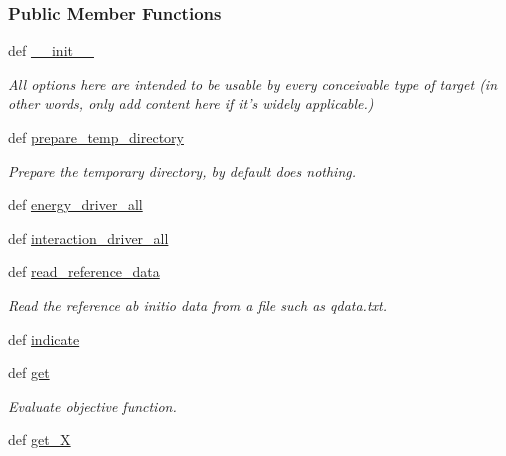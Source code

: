 \subsubsection*{\-Public \-Member \-Functions}
\begin{DoxyCompactItemize}
\item 
def \hyperlink{classforcebalance_1_1tinkerio_1_1Interaction__TINKER_a34afd2802edb7d35200abb09ccf6f8c7}{\-\_\-\-\_\-init\-\_\-\-\_\-}
\begin{DoxyCompactList}\small\item\em \-All options here are intended to be usable by every conceivable type of target (in other words, only add content here if it's widely applicable.) \end{DoxyCompactList}\item 
def \hyperlink{classforcebalance_1_1tinkerio_1_1Interaction__TINKER_a362b96263fb15f951fd7653b88a91efa}{prepare\-\_\-temp\-\_\-directory}
\begin{DoxyCompactList}\small\item\em \-Prepare the temporary directory, by default does nothing. \end{DoxyCompactList}\item 
def \hyperlink{classforcebalance_1_1tinkerio_1_1Interaction__TINKER_a5c55a2a8ed4c2923ed9866e1a7b6d202}{energy\-\_\-driver\-\_\-all}
\item 
def \hyperlink{classforcebalance_1_1tinkerio_1_1Interaction__TINKER_aa04011719babeea254134426db8c7633}{interaction\-\_\-driver\-\_\-all}
\item 
def \hyperlink{classforcebalance_1_1interaction_1_1Interaction_aa67c082c3b6fa2d87ba3f4cf1a74e4f8}{read\-\_\-reference\-\_\-data}
\begin{DoxyCompactList}\small\item\em \-Read the reference ab initio data from a file such as qdata.\-txt. \end{DoxyCompactList}\item 
def \hyperlink{classforcebalance_1_1interaction_1_1Interaction_a91f94b978b73dd886035dcdb96b53cc1}{indicate}
\item 
def \hyperlink{classforcebalance_1_1interaction_1_1Interaction_a9fc3a40eb2852241ea440af719f6cf29}{get}
\begin{DoxyCompactList}\small\item\em \-Evaluate objective function. \end{DoxyCompactList}\item 
def \hyperlink{classforcebalance_1_1target_1_1Target_a606dd136f195c267c05a2455405e5949}{get\-\_\-\-X}

\end{DoxyCompactItemize}
